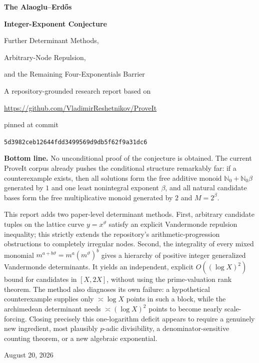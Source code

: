 \documentclass[11pt,oneside]{article}
\theoremstyle{definition}
\theoremstyle{remark}
\newcommand{\Nzero}{\mathbb N_0}
\newcommand{\thetaq}{\vartheta}
\newcommand{\commit}[1]{\texttt{#1}}
\begin{document}

\begin{titlepage}
\centering
\vspace*{0.75cm}
{\Huge\bfseries The Alaoglu--Erd\H{o}s\par}
\vspace{0.2cm}
{\Huge\bfseries Integer-Exponent Conjecture\par}
\vspace{0.65cm}
{\LARGE Further Determinant Methods,\par}
\vspace{0.12cm}
{\LARGE Arbitrary-Node Repulsion,\par}
\vspace{0.12cm}
{\LARGE and the Remaining Four-Exponentials Barrier\par}
\vspace{0.95cm}
{\large A repository-grounded research report based on\par}
\vspace{0.12cm}
{\large \url{https://github.com/VladimirReshetnikov/ProveIt}\par}
\vspace{0.35cm}
{\normalsize pinned at commit\par}
{\normalsize \commit{5d3982ceb12644fdd3499569d9db5f62f9a31dc6}\par}
\vfill
\begin{minipage}{0.9\textwidth}
\small
\textbf{Bottom line.}
No unconditional proof of the conjecture is obtained.  The current ProveIt corpus already
pushes the conditional structure remarkably far: if a counterexample exists, then all
solutions form the free additive monoid $\Nzero+\Nzero\beta$ generated by $1$ and one least
nonintegral exponent $\beta$, and all natural candidate bases form the free multiplicative
monoid generated by $2$ and $M=2^\beta$.

This report adds two paper-level determinant methods.  First, arbitrary candidate tuples on
the lattice curve $y=x^{\thetaq}$ satisfy an explicit Vandermonde repulsion inequality; this
strictly extends the repository's arithmetic-progression obstructions to completely irregular
nodes.  Second, the integrality of every mixed monomial
$m^{a+b\thetaq}=m^a(m^{\thetaq})^b$ gives a hierarchy of positive integer generalized
Vandermonde determinants.  It yields an independent, explicit
$O((\log X)^2)$ bound for candidates in $[X,2X]$, without using the prime-valuation rank theorem.
The method also diagnoses its own failure: a hypothetical counterexample supplies only
$\asymp\log X$ points in such a block, while the archimedean determinant needs
$\asymp(\log X)^2$ points to become nearly scale-forcing.  Closing precisely this one-logarithm
deficit appears to require a genuinely new ingredient, most plausibly $p$-adic divisibility,
a denominator-sensitive counting theorem, or a new algebraic exponential.
\end{minipage}
\vfill
{\large August 20, 2026\par}
\end{titlepage}
\end{document}
